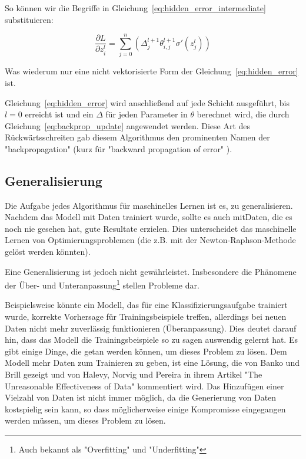 So können wir die Begriffe in Gleichung~\eqref{eq:hidden_error_intermediate} substituieren:

\begin{equation}
    \frac{\partial L}{\partial z^l_i} = \sum_{j=0}^n (\varDelta^{l+1}_j \theta^{l+1}_{i,j} \sigma'(z_j^l))
\end{equation}

Was wiederum nur eine nicht vektorisierte Form der Gleichung~\eqref{eq:hidden_error} ist.

Gleichung~\eqref{eq:hidden_error} wird anschließend auf jede Schicht ausgeführt, bis $l=0$ erreicht ist und ein $\varDelta$ für jeden Parameter in $\theta$ berechnet wird, die durch Gleichung~\eqref{eq:backprop_update} angewendet werden.
Diese Art des Rückwärtsschreiten gab diesem Algorithmus den prominenten Namen der "backpropagation" (kurz für "backward propagation of error" \cite{Rumelhart1986}).

\subsection{Generalisierung}

Die Aufgabe jedes Algorithmus für maschinelles Lernen ist es, zu generalisieren.
Nachdem das Modell mit Daten trainiert wurde, sollte es auch mitDaten, die es noch nie gesehen hat, gute Resultate erzielen.
Dies unterscheidet das maschinelle Lernen von Optimierungsproblemen (die z.B. mit der Newton-Raphson-Methode gelöst werden könnten).

Eine Generalisierung ist jedoch nicht gewährleistet. Insbesondere die Phänomene der Über- und Unteranpassung\footnote{Auch bekannt als "Overfitting" und "Underfitting"} stellen Probleme dar.

Beispielsweise könnte ein Modell, das für eine Klassifizierungsaufgabe trainiert wurde, korrekte Vorhersage für Trainingsbeispiele treffen, allerdings bei neuen Daten nicht mehr zuverlässig funktionieren (Überanpassung).
Dies deutet darauf hin, dass das Modell die Trainingsbeispiele so zu sagen auswendig gelernt hat.
Es gibt einige Dinge, die getan werden können, um dieses Problem zu lösen.
Dem Modell mehr Daten zum Trainieren zu geben, ist eine Lösung, die von Banko und Brill \cite{Banko2001} gezeigt und von Halevy, Norvig und Pereira in ihrem Artikel "The Unreasonable Effectiveness of Data" \cite{Halevy2009} kommentiert wird.
Das Hinzufügen einer Vielzahl von Daten ist nicht immer möglich, da die Generierung von Daten kostspielig sein kann, so dass möglicherweise einige Kompromisse eingegangen werden müssen, um dieses Problem zu lösen.

